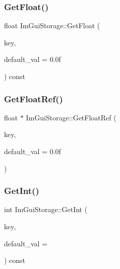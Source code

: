 \subsubsection{\texorpdfstring{Get\+Float()}{GetFloat()}}
{\footnotesize\ttfamily float Im\+Gui\+Storage\+::\+Get\+Float (\begin{DoxyParamCaption}\item[{\mbox{\hyperlink{imgui_8h_a1785c9b6f4e16406764a85f32582236f}{Im\+Gui\+ID}}}]{key,  }\item[{float}]{default\+\_\+val = {\ttfamily 0.0f} }\end{DoxyParamCaption}) const}

\mbox{\label{struct_im_gui_storage_a4b51cc8c92c65d4224af65a8ce7752ee}} 
\subsubsection{\texorpdfstring{Get\+Float\+Ref()}{GetFloatRef()}}
{\footnotesize\ttfamily float $\ast$ Im\+Gui\+Storage\+::\+Get\+Float\+Ref (\begin{DoxyParamCaption}\item[{\mbox{\hyperlink{imgui_8h_a1785c9b6f4e16406764a85f32582236f}{Im\+Gui\+ID}}}]{key,  }\item[{float}]{default\+\_\+val = {\ttfamily 0.0f} }\end{DoxyParamCaption})}

\mbox{\label{struct_im_gui_storage_ac86b64f5c69a15de6c6c326963eca64a}} 
\subsubsection{\texorpdfstring{Get\+Int()}{GetInt()}}
{\footnotesize\ttfamily int Im\+Gui\+Storage\+::\+Get\+Int (\begin{DoxyParamCaption}\item[{\mbox{\hyperlink{imgui_8h_a1785c9b6f4e16406764a85f32582236f}{Im\+Gui\+ID}}}]{key,  }\item[{int}]{default\+\_\+val = {} }\end{DoxyParamCaption}) const}

